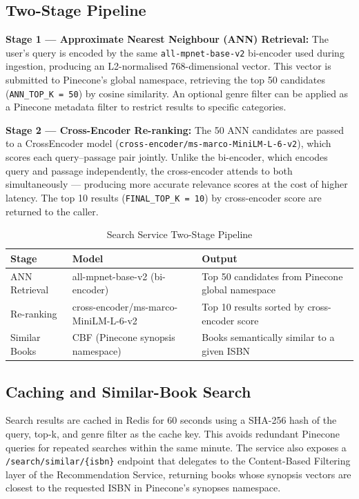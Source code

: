 \subsection{Two-Stage Pipeline}

\textbf{Stage 1 --- Approximate Nearest Neighbour (ANN) Retrieval:} The user's
query is encoded by the same \texttt{all-mpnet-base-v2} bi-encoder used during
ingestion, producing an L2-normalised 768-dimensional vector. This vector is
submitted to Pinecone's global namespace, retrieving the top 50 candidates
(\texttt{ANN\_TOP\_K = 50}) by cosine similarity. An optional genre filter can
be applied as a Pinecone metadata filter to restrict results to specific
categories.

\textbf{Stage 2 --- Cross-Encoder Re-ranking:} The 50 ANN candidates are
passed to a CrossEncoder model
(\texttt{cross-encoder/ms-marco-MiniLM-L-6-v2}), which scores each
query--passage pair jointly. Unlike the bi-encoder, which encodes query and
passage independently, the cross-encoder attends to both simultaneously ---
producing more accurate relevance scores at the cost of higher latency. The
top 10 results (\texttt{FINAL\_TOP\_K = 10}) by cross-encoder score are
returned to the caller.

\begin{table}[H]
\centering
\caption{Search Service Two-Stage Pipeline}
\label{tab:searchpipeline}
\begin{tabularx}{\textwidth}{|l|l|X|}
\hline
\textbf{Stage} & \textbf{Model} & \textbf{Output} \\
\hline
ANN Retrieval  & all-mpnet-base-v2 (bi-encoder) & Top 50 candidates from Pinecone global namespace \\
\hline
Re-ranking     & cross-encoder/ms-marco-MiniLM-L-6-v2 & Top 10 results sorted by cross-encoder score \\
\hline
Similar Books  & CBF (Pinecone synopsis namespace) & Books semantically similar to a given ISBN \\
\hline
\end{tabularx}
\end{table}

\subsection{Caching and Similar-Book Search}

Search results are cached in Redis for 60 seconds using a SHA-256 hash of the
query, top-k, and genre filter as the cache key. This avoids redundant
Pinecone queries for repeated searches within the same minute. The service also
exposes a \texttt{/search/similar/\{isbn\}} endpoint that delegates to the
Content-Based Filtering layer of the Recommendation Service, returning books
whose synopsis vectors are closest to the requested ISBN in Pinecone's
synopses namespace.

